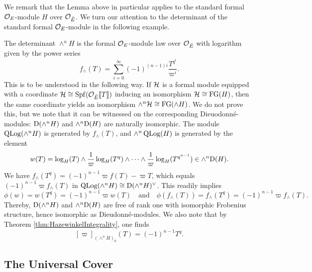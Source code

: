 \documentclass[../main.tex]{subfiles}
\begin{document}
We remark that the Lemma above in particular applies to the standard formal 
$\mathcal{O}_E$-module $H$ over $\mathcal{O}_{\breve {E}}$. We turn our attention to the determinant of the standard
formal $\mathcal{O}_E$-module in the following example.

\begin{xpl}
  The determinant $\wedge^n H$ is the formal $\mathcal{O}_E$-module law over 
  $\mathcal{O}_{\breve {E}}$ with logarithm given by the power series
  \begin{equation*}
    f_\wedge(T) = \sum_{i=0}^\infty (-1)^{(n-1)i} \frac{T^{q^i}}{\varpi^i}.
  \end{equation*}
  This is to be understood in the following way. If $\mathcal{H}$ is a formal module
  equipped with a coordinate $\mathcal{H} \cong \operatorname{Spf}(\mathcal{O}_{\breve {E}} \llbracket T \rrbracket)$ inducing an 
  isomorphism $\mathcal{H} \cong \textnormal{FG}(H)$, then the same coordinate yields 
  an isomorphism $\wedge^n \mathcal{H} \cong \textnormal{FG}(\wedge H)$. We do not prove this,
  but we note that it can be witnessed on the
  corresponding Dieuodonn\'e-modules: $\mathrm{D}(\wedge^n H)$ and 
  $\wedge^n \mathrm{D}(H)$ are naturally isomorphic. The module $\operatorname {QLog}(\wedge^n H)$
  is
  generated by $f_\wedge(T)$, and $\wedge^n \operatorname {QLog}(H)$ is generated by the element
  \begin{equation*}
    w(T) = \log_H(T) \wedge \frac 1\varpi \log_H(T^q) \wedge \dots \wedge \frac 1\varpi \log_H(T^{q^{n-1}}) \in \wedge^n \mathrm{D}(H).
  \end{equation*}
  We have $f_\wedge(T^q) = (-1)^{n-1} \varpi f(T) - \varpi T$, which equals
  $(-1)^{n-1}\varpi f_\wedge(T)$ in $\operatorname {QLog}(\wedge^n H) \cong \mathrm{D}(\wedge^n
  H)^\vee$. 
  This readily implies
  \begin{equation*}
    \phi(w) = w(T^q) = (-1)^{n-1} \varpi w(T) \quad \text{and} \quad
    \phi(f_\wedge(T)) = f_\wedge(T^q) = (-1)^{n-1}\varpi f_\wedge(T).
  \end{equation*}
  Thereby, $\mathrm{D}(\wedge^n H)$ and $\wedge^n \mathrm{D}(H)$ are free of rank one
  with isomorphic Frobenius structure, hence isomorphic as Dieudonn\'e-modules.
  We also note that by Theorem \ref{thm:HazewinkelIntegrality}, one finds
  \begin{equation} \label{eq:detformalmodulevarpiexpl}
    [\varpi]_{(\wedge^n H)_0}(T) = (-1)^{n-1} T^q.
  \end{equation}
\end{xpl}

\subsection{The Universal Cover} %
\label{sub:Tate Modules and the Universal Cover} 
\end{document}
